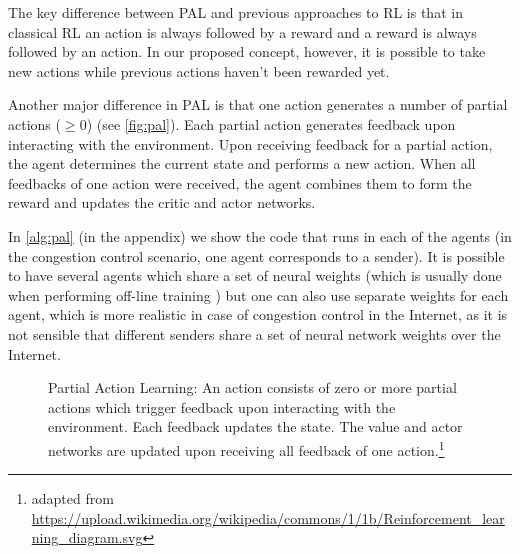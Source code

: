 \documentclass[newfonts=false,format=sigconf,10pt,letterpaper]{acmart}
\begin{document}
The key difference between PAL and previous approaches to RL is that in classical RL an action is always followed by a reward and a reward is always followed by an action. In our proposed concept, however, it is possible to take new actions while previous actions haven't been rewarded yet.

Another major difference in PAL is that one action generates a number of partial actions ($\geq 0$) (see \autoref{fig:pal}). Each partial action generates feedback upon interacting with the environment. Upon receiving feedback for a partial action, the agent determines the current state and performs a new action. When all feedbacks of one action were received, the agent combines them to form the reward and updates the critic and actor networks.

In \autoref{alg:pal} (in the appendix) we show the code that runs in each of the agents (in the congestion control scenario, one agent corresponds to a sender). It is possible to have several agents which share a set of neural weights (which is usually done when performing off-line training \cite{mnih_asynchronous_2016,mao_neural_2017}) but one can also use separate weights for each agent, which is more realistic in case of congestion control in the Internet, as it is not sensible that different senders share a set of neural network weights over the Internet.

%

\begin{figure}
\begin{minipage}{\columnwidth}
%

\caption{Partial Action Learning: An action consists of zero or more partial actions which trigger feedback upon interacting with the environment. Each feedback updates the state. The value and actor networks are updated upon receiving all feedback of one action.\protect\footnote{adapted from \url{https://upload.wikimedia.org/wikipedia/commons/1/1b/Reinforcement_learning_diagram.svg}}}
\label{fig:pal}
\end{minipage}
\end{figure}
\end{document}
